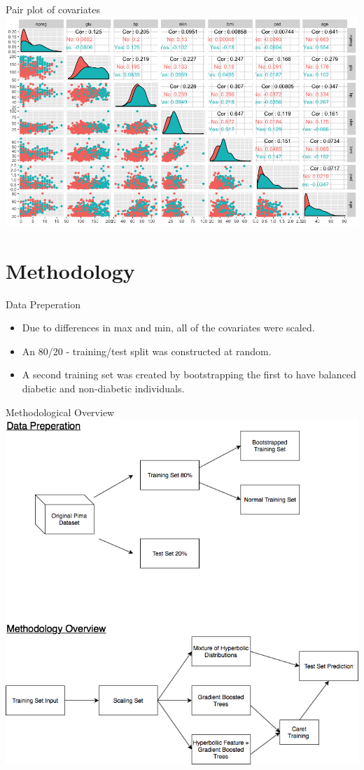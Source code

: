 \documentclass{beamer}
\begin{document}


\begin{frame}{Pair plot of covariates}
\includegraphics[scale=0.35]{plotgg}
\end{frame}

\section{Methodology}


\begin{frame}{Data Preperation}
\begin{itemize}
\item Due to differences in max and min, all of the covariates were scaled. 
\item An 80/20 - training/test split was constructed at random. 
\item A second training set was created by bootstrapping the first to have balanced diabetic and non-diabetic individuals.

\end{itemize}
\end{frame}


\begin{frame}{Methodological Overview}
\includegraphics[scale=0.30]{MethodOverview}
\end{frame}
\end{document}
